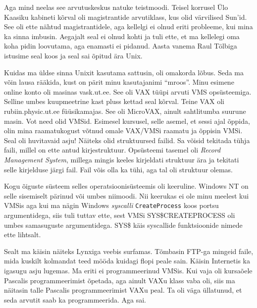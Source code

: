 Aga mind neelas see arvutuskeskus natuke teistmoodi. Teisel korrusel Ülo Kaasiku kabineti kõrval oli magistrantide arvutiklass, kus olid värvilised Sun'id. See oli ette nähtud magistrantidele, aga kellelgi ei olnud eriti probleeme, kui mina ka sinna imbusin. Aegajalt seal ei olnud kohti ja tuli ette, et ma kellelegi oma koha pidin loovutama, aga enamasti ei pidanud. Aasta vanema Raul Tölbiga istusime seal koos ja seal sai õpitud ära Unix. 

Kuidas ma üldse sinna Unixit kasutama sattusin, oli omakorda lõbus. Seda ma võin lausa rääkida, kust on pärit minu kasutajanimi \enquote{mroos}. Minu esimene online konto oli masinas vask.ut.ee. See oli VAX tüüpi arvuti VMS opsüsteemiga. Selline umbes kuupmeetrine kast pluss kettad seal kõrval. Teine VAX oli rubiin.physic.ut.ee füüsikamajas. See oli MicroVAX, ainult sahtlitumba suurune masin. Vot need olid VMSid. Esimesel kursusel, selle asemel, et sessi ajal õppida, olin mina raamatukogust võtnud omale VAX/VMSi raamatu ja õppisin VMSi. Seal oli huvitavaid asju! Näiteks olid struktuursed failid. Sa võisid tekitada tühja faili, millel on ette antud kirjestruktuur. Opsüsteemi tasemel oli \emph{Record Management System}, millega mingis keeles kirjeldati struktuur ära ja tekitati selle kirjelduse järgi fail. Fail võis olla ka tühi, aga tal oli struktuur olemas. 

Kogu õiguste süsteem selles operatsioonisüsteemis oli keeruline. Windows NT on selle sisemiselt pärinud või umbes niimoodi. Nii keerukas ei ole minu meelest kui VMSis aga kui ma nägin Windows \emph{syscalli} \verb|CreateProcess| koos portsu argumentidega, siis tuli tuttav ette, sest VMSi SYS\$CREATEPROCESS oli umbes samasuguste argumentidega. SYS\$ käis syscallide funktsioonide nimede ette lihtsalt. 

Sealt ma käisin näiteks Lynxiga veebis surfamas. Tõmbasin FTP-ga mingeid faile, mida kuskilt kolmandat teed mööda kuidagi flopi peale sain. Käisin Internetis ka igasugu asju lugemas. Ma eriti ei programmeerinud VMSis. Kui vaja oli kursaõele Pascalis programmeerimist õpetada, aga ainult VAXu klass vaba oli, siis ma näitasin talle Pascalis programmeerimist VAXu peal. Ta oli väga üllatunud, et seda arvutit saab ka programmeerida. Aga sai. 

